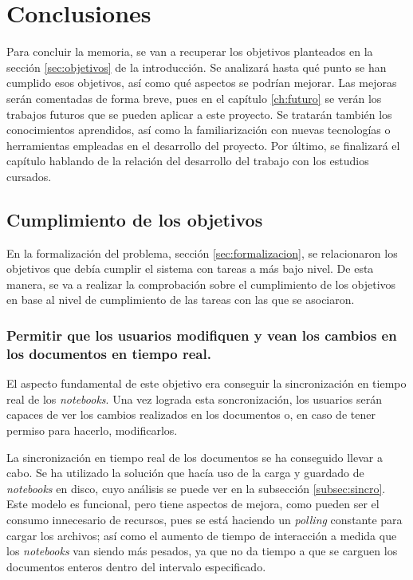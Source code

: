 \documentclass[11pt,spanish,listoffigures]{tfgetsinf}
\begin{document}


\chapter{Conclusiones}
\label{ch:conclusiones}

Para concluir la memoria, se van a recuperar los objetivos planteados en la sección \ref{sec:objetivos} de la introducción. Se analizará hasta qué punto se han cumplido esos objetivos, así como qué aspectos se podrían mejorar. Las mejoras serán comentadas de forma breve, pues en el capítulo \ref{ch:futuro} se verán los trabajos futuros que se pueden aplicar a este proyecto. Se tratarán también los conocimientos aprendidos, así como la familiarización con nuevas tecnologías o herramientas empleadas en el desarrollo del proyecto. Por último, se finalizará el capítulo hablando de la relación del desarrollo del trabajo con los estudios cursados.



\section{Cumplimiento de los objetivos}
\label{sec:conc-objetivos}

En la formalización del problema, sección \ref{sec:formalizacion}, se relacionaron los objetivos que debía cumplir el sistema con tareas a más bajo nivel. De esta manera, se va a realizar la comprobación sobre el cumplimiento de los objetivos en base al nivel de cumplimiento de las tareas con las que se asociaron.


\subsection{Permitir que los usuarios modifiquen y vean los cambios en los documentos en tiempo real.}
\label{subsec:objetivos-conc-sincro}

El aspecto fundamental de este objetivo era conseguir la sincronización en tiempo real de los \textit{notebooks}. Una vez lograda esta soncronización, los usuarios serán capaces de ver los cambios realizados en los documentos o, en caso de tener permiso para hacerlo, modificarlos.

La sincronización en tiempo real de los documentos se ha conseguido llevar a cabo. Se ha utilizado la solución que hacía uso de la carga y guardado de \textit{notebooks} en disco, cuyo análisis se puede ver en la subsección \ref{subsec:sincro}. Este modelo es funcional, pero tiene aspectos de mejora, como pueden ser el consumo innecesario de recursos, pues se está haciendo un \textit{\gls{polling}} constante para cargar los archivos; así como el aumento de tiempo de interacción a medida que los \textit{notebooks} van siendo más pesados, ya que no da tiempo a que se carguen los documentos enteros dentro del intervalo especificado.
\end{document}
